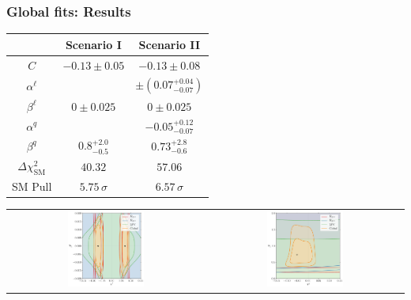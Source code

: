 \documentclass[mathserif, 10pt]{beamer}
\begin{document}
\begin{frame}
    \frametitle{Global fits: Results}
    \begin{center}\small
        \begin{tabular}{|c|c|c|}\hline
                                        & Scenario I          & Scenario II                  \\\hline
            $C$                         & $-0.13 \pm 0.05$    & $-0.13 \pm 0.08$             \\\hline
            $\alpha^\ell$               &                     & $\pm (0.07^{+0.04}_{-0.07})$ \\\hline
            $\beta^\ell$                & $0 \pm 0.025$       & $0 \pm 0.025$                \\\hline
            $\alpha^q$                  &                     & $-0.05^{+0.12}_{-0.07}$      \\\hline
            $\beta^q$                   & $0.8^{+2.0}_{-0.5}$ & $0.73^{+2.8}_{-0.6}$         \\\hline
            $\Delta \chi^2_\mathrm{SM}$ & $40.32$               & $57.06$                        \\\hline
            SM Pull                     & $5.75\,\sigma$      & $6.57\,\sigma$               \\\hline
        \end{tabular}
    \end{center}
    \begin{center}
        \begin{tabular}{cc}
            \includegraphics[width=0.4\textwidth]{figures/alphabeta_l.pdf} & \includegraphics[width=0.4\textwidth]{figures/alphabeta_q.pdf}
        \end{tabular}
    \end{center}

\end{frame}
\end{document}
